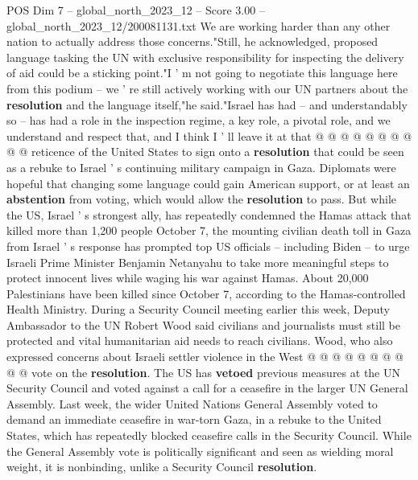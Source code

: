 \begin{textsample}{POS Dim 7 – global\_north\_2023\_12 – Score 3.00 – global\_north\_2023\_12/200081131.txt}
We are working harder than any other nation to actually address those concerns."Still, he acknowledged, proposed language tasking the UN with exclusive responsibility for inspecting the delivery of aid could be a sticking point."I ' m not going to negotiate this language here from this podium -- we ' re still actively working with our UN partners about the \textbf{resolution} and the language itself,"he said."Israel has had -- and understandably so -- has had a role in the inspection regime, a key role, a pivotal role, and we understand and respect that, and I think I ' ll leave it at that @ @ @ @ @ @ @ @ @ @ reticence of the United States to sign onto a \textbf{resolution} that could be seen as a rebuke to Israel ' s continuing military campaign in Gaza.
Diplomats were hopeful that changing some language could gain American support, or at least an \textbf{abstention} from voting, which would allow the \textbf{resolution} to pass.
But while the US, Israel ' s strongest ally, has repeatedly condemned the Hamas attack that killed more than 1,200 people October 7, the mounting civilian death toll in Gaza from Israel ' s response has prompted top US officials -- including Biden -- to urge Israeli Prime Minister Benjamin Netanyahu to take more meaningful steps to protect innocent lives while waging his war against Hamas.
About 20,000 Palestinians have been killed since October 7, according to the Hamas-controlled Health Ministry.
During a Security Council meeting earlier this week, Deputy Ambassador to the UN Robert Wood said civilians and journalists must still be protected and vital humanitarian aid needs to reach civilians.
Wood, who also expressed concerns about Israeli settler violence in the West @ @ @ @ @ @ @ @ @ @ vote on the \textbf{resolution}.
The US has \textbf{vetoed} previous measures at the UN Security Council and voted against a call for a ceasefire in the larger UN General Assembly.
Last week, the wider United Nations General Assembly voted to demand an immediate ceasefire in war-torn Gaza, in a rebuke to the United States, which has repeatedly blocked ceasefire calls in the Security Council.
While the General Assembly vote is politically significant and seen as wielding moral weight, it is nonbinding, unlike a Security Council \textbf{resolution}.

\end{textsample}
